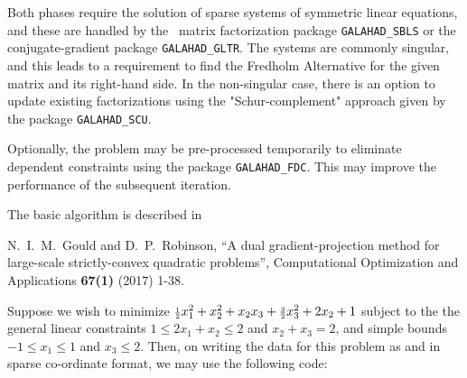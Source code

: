 \documentclass{galahad}
\begin{document}
Both phases require
the solution of sparse systems of symmetric linear equations, and these
are handled by the \galahad\ matrix factorization package {\tt GALAHAD\_SBLS}
or the conjugate-gradient package {\tt GALAHAD\_GLTR}.
The systems are commonly singular, and this leads to a requirement to
find the Fredholm Alternative for the given matrix and its right-hand side.
In the non-singular case, there is an option to update existing factorizations
using the "Schur-complement" approach given by the package {\tt GALAHAD\_SCU}.

Optionally, the problem may be pre-processed temporarily to eliminate dependent
constraints using the package {\tt GALAHAD\_FDC}. This may improve the
performance of the subsequent iteration.

\vspace*{1mm}

\galreferences
\vspace*{1mm}

\noindent
The basic algorithm is described in
\vspace*{1mm}

\noindent
N.\ I.\ M.\ Gould and D.\ P.\ Robinson,
``A dual gradient-projection method
for large-scale strictly-convex quadratic problems'',
Computational Optimization and Applications
{\bf 67(1)} (2017) 1-38.



\galexample
Suppose we wish to minimize
${\scriptstyle \frac{1}{2}} x_1^2 + x_2^2 + x_2 x_3 + {\scriptstyle \frac{3}{2}} x_3^2 + 2 x_2 + 1$
subject to the the general linear constraints
$1 \leq  2 x_{1}  +  x_{2}  \leq  2$ and
$x_{2}  +  x_{3}  =  2$, and simple bounds
$-1  \leq  x_{1}  \leq  1$ and $x_{3}  \leq  2$.
Then, on writing the data for this problem as
and
in sparse co-ordinate format, we may use the following code:
\end{document}
